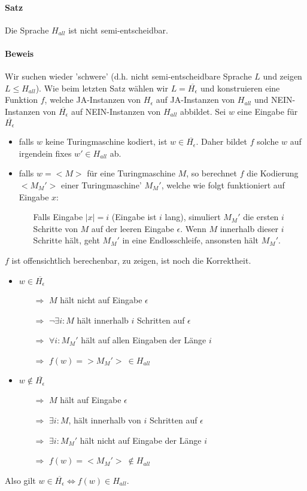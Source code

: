 \paragraph*{Satz} Die Sprache $H_{all}$ ist nicht semi-entscheidbar.

\paragraph*{Beweis} Wir suchen wieder 'schwere' (d.h. nicht semi-entscheidbare Sprache $L$ und zeigen $L \leq H_{all}$). Wie beim letzten Satz wählen wir $L=\overline{H_\epsilon}$ und konstruieren eine Funktion $f$, welche JA-Instanzen von $H_\epsilon$ auf JA-Instanzen von $H_{all}$ und NEIN-Instanzen von $\overline{H_\epsilon}$ auf NEIN-Instanzen von $H_{all}$ abbildet.
Sei $w$ eine Eingabe für $\overline{H_\epsilon}$
\begin{itemize}
	\item falls $w$ keine Turingmaschine kodiert, ist $w \in \overline{H_\epsilon}$. Daher bildet $f$ solche $w$ auf irgendein fixes $w' \in H_{all}$ ab.
	\item falls $w=<M>$ für eine Turingmaschine $M$, so berechnet $f$ die Kodierung $<M_M'>$ einer Turingmaschine' $M_M'$, welche wie folgt funktioniert auf Eingabe $x$:
	\begin{itemize}
		\item[] Falls Eingabe $|x|=i$ (Eingabe ist $i$ lang), simuliert $M_M'$ die ersten $i$ Schritte von $M$ auf der leeren Eingabe $\epsilon$. Wenn $M$ innerhalb dieser $i$ Schritte hält, geht $M_M'$ in eine Endlosschleife, ansonsten hält $M_M'$.
	\end{itemize}
\end{itemize}
$f$ ist offensichtlich berechenbar, zu zeigen, ist noch die Korrektheit.
\begin{itemize}
	\item $w \in \overline{H_\epsilon}$
	\begin{itemize}
		\item[$\Rightarrow$] $M$ hält nicht auf Eingabe $\epsilon$
		\item[$\Rightarrow$] $\lnot\exists i : M$ hält innerhalb $i$ Schritten auf $\epsilon$
		\item[$\Rightarrow$] $\forall i : M_M'$ hält auf allen Eingaben der Länge $i$
		\item[$\Rightarrow$] $f(w)=>M_M'>\ \in H_{all}$
	\end{itemize}
	\item $w \not\in \overline{H_\epsilon}$
	\begin{itemize}
		\item[$\Rightarrow$] $M$ hält auf Eingabe $\epsilon$
		\item[$\Rightarrow$] $\exists i : M$, hält innerhalb von $i$ Schritten auf $\epsilon$
		\item[$\Rightarrow$] $\exists i : M_M'$ hält nicht auf Eingabe der Länge $i$
		\item[$\Rightarrow$] $f(w)=<M_M'>\ \not \in H_{all}$
	\end{itemize}
\end{itemize}
Also gilt $w \in \overline{H_\epsilon} \Leftrightarrow f(w) \in H_{all}$.

